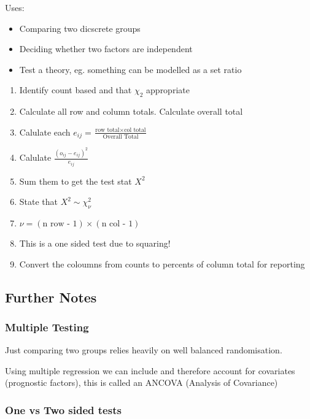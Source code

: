 \documentclass[
  letterpaper,
  DIV=11,
  numbers=noendperiod]{scrreprt}
\providecommand{\tightlist}{%
  \setlength{\itemsep}{0pt}\setlength{\parskip}{0pt}}\usepackage{longtable,booktabs,array}
\begin{document}
Uses:

\begin{itemize}
\tightlist
\item
  Comparing two dicscrete groups
\item
  Deciding whether two factors are independent
\item
  Test a theory, eg. something can be modelled as a set ratio
\end{itemize}

\begin{enumerate}
\def\labelenumi{\arabic{enumi})}
\tightlist
\item
  Identify count based and that \(\chi_2\) appropriate
\item
  Calculate all row and column totals. Calculate overall total
\item
  Calulate each
  \(e_{ij} = \frac{\text{row total}\times \text{col total}}{\text{Overall Total}}\)
\item
  Calulate \(\frac{(o_{ij}-e_{ij})^2}{e_{ij}}\)
\item
  Sum them to get the test stat \(X^2\)
\item
  State that \(X^2 \sim \chi^2_{\nu}\)
\item
  \(\nu = (\text{n row - 1})\times (\text{n col - 1})\)
\item
  This is a one sided test due to squaring!
\item
  Convert the coloumns from counts to percents of column total for
  reporting
\end{enumerate}

\hypertarget{further-notes}{%
\subsection{Further Notes}\label{further-notes}}

\hypertarget{multiple-testing}{%
\subsubsection{Multiple Testing}\label{multiple-testing}}

Just comparing two groups relies heavily on well balanced randomisation.

Using multiple regression we can include and therefore account for
covariates (prognostic factors), this is called an ANCOVA (Analysis of
Covariance)

\hypertarget{one-vs-two-sided-tests}{%
\subsubsection{One vs Two sided tests}\label{one-vs-two-sided-tests}}
\end{document}

